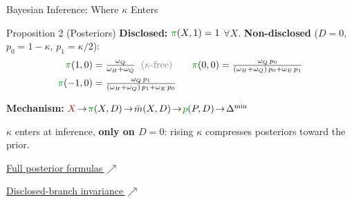 \documentclass[aspectratio=169,10pt]{beamer}
\newcommand{\1}{\mathbf{1}}
\newcommand{\obs}[1]{\textcolor{red!70!black}{#1}}
\newcommand{\outcome}[1]{\textcolor{green!50!black}{#1}}
\newcommand{\backuplink}[2]{%
  \hfill{\scriptsize\hyperlink{#1}{\textcolor{brightblue}{#2\,$\nearrow$}}}%
}
\begin{document}
\begin{frame}{Bayesian Inference: Where $\kappa$ Enters}
\hypertarget{main:prop2}{}
\small
\begin{block}{Proposition 2 (Posteriors)}
\vspace{-0.2em}
\textbf{Disclosed:} $\outcome{\pi}(X,1) = 1$ $\forall X$. \quad
\textbf{Non-disclosed} ($D{=}0$, $p_0 {=} 1{-}\kappa$, $p_1 {=} \kappa/2$):
\vspace{-0.3em}
\begin{align*}
\outcome{\pi}(1,0) &= \tfrac{\omega_Q}{\omega_H + \omega_Q} \;\; \textcolor{gray}{\text{($\kappa$-free)}} \qquad
\outcome{\pi}(0,0) = \tfrac{\omega_Q\,p_0}{(\omega_H {+} \omega_Q)\,p_0 + \omega_E\,p_1}\\[0.1em]
\outcome{\pi}(-1,0) &= \tfrac{\omega_Q\,p_1}{(\omega_H {+} \omega_Q)\,p_1 + \omega_E\,p_0}
\end{align*}
\vspace{-0.8em}
\end{block}

\vspace{0.1em}

{\footnotesize\textbf{Mechanism:}\;
$\obs{X} \!\to\! \outcome{\pi}(X,D) \!\to\! \bar{m}(X,D) \!\to\! \outcome{p}(P,D) \!\to\! \Delta^{\min}$}

\vspace{0.1em}
$\kappa$ enters at inference, \textbf{only on $D{=}0$}: rising $\kappa$ compresses posteriors toward the prior.

\backuplink{backup:full_posteriors}{Full posterior formulas}
\backuplink{backup:disclosed_invariance}{Disclosed-branch invariance}
\end{frame}
\end{document}
